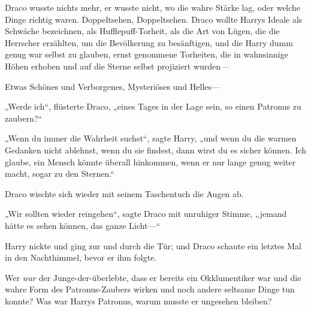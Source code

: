 Draco wusste nichts mehr, er wusste nicht, wo die wahre Stärke lag, oder welche Dinge richtig waren. Doppeltsehen, Doppeltsehen. Draco wollte Harrys Ideale als Schwäche bezeichnen, als Hufflepuff-Torheit, als die Art von Lügen, die die Herrscher erzählten, um die Bevölkerung zu besänftigen, und die Harry dumm genug war selbst zu glauben, ernst genommene Torheiten, die in wahnsinnige Höhen erhoben und auf die Sterne selbst projiziert wurden—

Etwas Schönes und Verborgenes, Mysteriöses und Helles—

„Werde ich“, flüsterte Draco, „eines Tages in der Lage sein, so einen Patronus zu zaubern?“

„Wenn du immer die Wahrheit suchst“, sagte Harry, „und wenn du die warmen Gedanken nicht ablehnst, wenn du sie findest, dann wirst du es sicher können. Ich glaube, ein Mensch könnte überall hinkommen, wenn er nur lange genug weiter macht, sogar zu den Sternen.“

Draco wischte sich wieder mit seinem Taschentuch die Augen ab.

„Wir sollten wieder reingehen“, sagte Draco mit unruhiger Stimme, „jemand hätte es sehen können, das ganze Licht—“

Harry nickte und ging zur und durch die Tür; und Draco schaute ein letztes Mal in den Nachthimmel, bevor er ihm folgte.

Wer \emph{war} der Junge-der-überlebte, dass er bereits ein Okklumentiker war und die wahre Form des Patronus-Zaubers wirken und noch andere seltsame Dinge tun konnte? Was war Harrys Patronus, warum musste er ungesehen bleiben?


